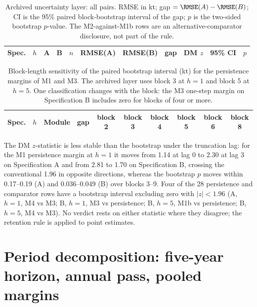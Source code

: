 \begin{table}[!htb]
\centering\scriptsize
\setlength{\tabcolsep}{3.5pt}
\caption{Archived uncertainty layer: all pairs. RMSE in kt; gap $=\RMSE(A)-\RMSE(B)$; CI is the 95\% paired block-bootstrap interval of the gap; $p$ is the two-sided bootstrap $p$-value. The M2-against-M1b rows are an alternative-comparator disclosure, not part of the rule.}
\label{tab:si_dm}
\scriptsize\setlength{\tabcolsep}{2.5pt}
\begin{tabular}{@{}ccllrrrrrlr@{}}
\toprule
Spec. & $h$ & A & B & $n$ & RMSE(A) & RMSE(B) & gap & DM $z$ & 95\% CI & $p$ \\
\midrule

\bottomrule
\end{tabular}
\end{table}

\begin{table}[!htb]
\centering\scriptsize
\setlength{\tabcolsep}{2.6pt}
\caption{Block-length sensitivity of the paired bootstrap interval (kt) for the persistence margins of M1 and M3. The archived layer uses block 3 at $h=1$ and block 5 at $h=5$. One classification changes with the block: the M3 one-step margin on Specification B includes zero for blocks of four or more.}
\label{tab:si_blocks}
\scriptsize\setlength{\tabcolsep}{2.5pt}
\begin{tabular}{@{}cclrcccccc@{}}
\toprule
Spec. & $h$ & Module & gap & block 2 & block 3 & block 4 & block 5 & block 6 & block 8 \\
\midrule

\bottomrule
\end{tabular}
\end{table}

The DM $z$-statistic is less stable than the bootstrap under the truncation lag: for the M1 persistence margin at $h=1$ it moves from 1.14 at lag 0 to 2.30 at lag 3 on Specification A and from 2.81 to 1.70 on Specification B, crossing the conventional 1.96 in opposite directions, whereas the bootstrap $p$ moves within 0.17--0.19 (A) and 0.036--0.049 (B) over blocks 3--9. Four of the 28 persistence and comparator rows have a bootstrap interval excluding zero with $|z|<1.96$ (A, $h=1$, M4 vs M3; B, $h=1$, M3 vs persistence; B, $h=5$, M1b vs persistence; B, $h=5$, M4 vs M3). No verdict rests on either statistic where they disagree; the retention rule is applied to point estimates.

\FloatBarrier
\section{Period decomposition: five-year horizon, annual pass, pooled margins}\label{si:periods}

